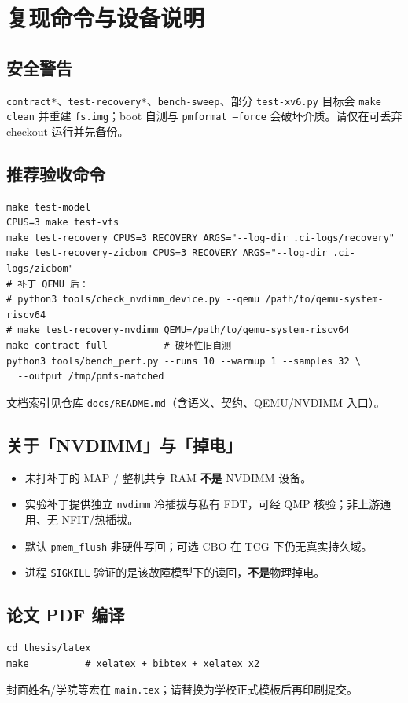 \chapter{复现命令与设备说明}
\label{app:repro}

\section{安全警告}

\texttt{contract*}、\texttt{test-recovery*}、\texttt{bench-sweep}、部分 \texttt{test-xv6.py} 目标会 \texttt{make clean} 并重建 \texttt{fs.img}；boot 自测与 \texttt{pmformat --force} 会破坏介质。请仅在可丢弃 checkout 运行并先备份。

\section{推荐验收命令}

\begin{lstlisting}
make test-model
CPUS=3 make test-vfs
make test-recovery CPUS=3 RECOVERY_ARGS="--log-dir .ci-logs/recovery"
make test-recovery-zicbom CPUS=3 RECOVERY_ARGS="--log-dir .ci-logs/zicbom"
# 补丁 QEMU 后：
# python3 tools/check_nvdimm_device.py --qemu /path/to/qemu-system-riscv64
# make test-recovery-nvdimm QEMU=/path/to/qemu-system-riscv64
make contract-full          # 破坏性旧自测
python3 tools/bench_perf.py --runs 10 --warmup 1 --samples 32 \
  --output /tmp/pmfs-matched
\end{lstlisting}

文档索引见仓库 \texttt{docs/README.md}（含语义、契约、QEMU/NVDIMM 入口）。

\section{关于「NVDIMM」与「掉电」}

\begin{itemize}[leftmargin=2em]
  \item 未打补丁的 MAP / 整机共享 RAM \textbf{不是} NVDIMM 设备。
  \item 实验补丁提供独立 \texttt{nvdimm} 冷插拔与私有 FDT，可经 QMP 核验；非上游通用、无 NFIT/热插拔。
  \item 默认 \texttt{pmem\_flush} 非硬件写回；可选 CBO 在 TCG 下仍无真实持久域。
  \item 进程 \texttt{SIGKILL} 验证的是该故障模型下的读回，\textbf{不是}物理掉电。
\end{itemize}

\section{论文 PDF 编译}

\begin{lstlisting}
cd thesis/latex
make          # xelatex + bibtex + xelatex x2
\end{lstlisting}

封面姓名/学院等宏在 \texttt{main.tex}；请替换为学校正式模板后再印刷提交。
